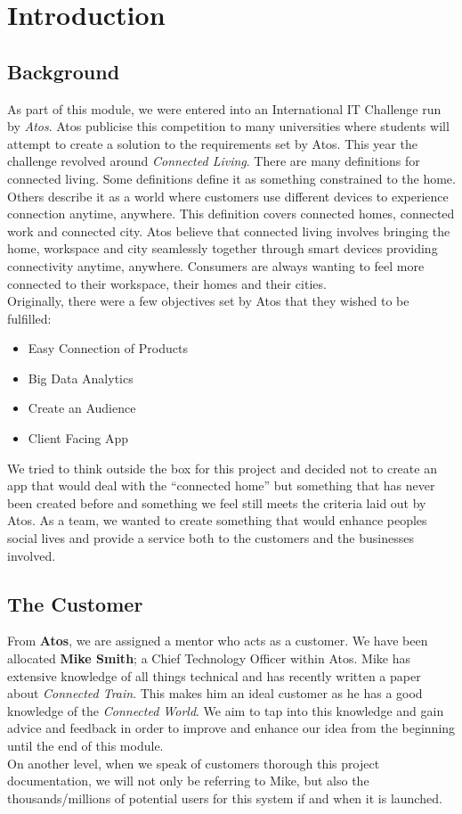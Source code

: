 \section{Introduction}

\subsection{Background}
As part of this module, we were entered into an International IT Challenge run by \emph{Atos}.  Atos publicise this competition to many universities where students will attempt to create a solution to the requirements set by Atos.  This year the challenge revolved around \emph{Connected Living}.  There are many definitions for connected living.  Some definitions define it as something constrained to the home.  Others describe it as a world where customers use different devices to experience connection anytime, anywhere.  This definition covers connected homes, connected work and connected city.  Atos believe that connected living involves bringing the home, workspace and city seamlessly together through smart devices providing connectivity anytime, anywhere.  Consumers are always wanting to feel more connected to their workspace, their homes and their cities.  \\
Originally, there were a few objectives set by Atos that they wished to be fulfilled:
\begin{itemize}
\item Easy Connection of Products
\item Big Data Analytics
\item Create an Audience
\item Client Facing App
\end{itemize}
We tried to think outside the box for this project and decided not to create an app that would deal with the ``connected home'' but something that has never been created before and something we feel still meets the criteria laid out by Atos.  As a team, we wanted to create something that would enhance peoples social lives and provide a service both to the customers and the businesses involved.  

\subsection{The Customer}
From \textbf{Atos}, we are assigned a mentor who acts as a customer.  We have been allocated \textbf{Mike Smith}; a Chief Technology Officer within Atos.  Mike has extensive knowledge of all things technical and has recently written a paper about \emph{Connected Train}.  This makes him an ideal customer as he has a good knowledge of the \emph{Connected World}.  We aim to tap into this knowledge and gain advice and feedback in order to improve and enhance our idea from the beginning until the end of this module.  \\
On another level, when we speak of customers thorough this project documentation, we will not only be referring to Mike, but also the thousands/millions of potential users for this system if and when it is launched.  

